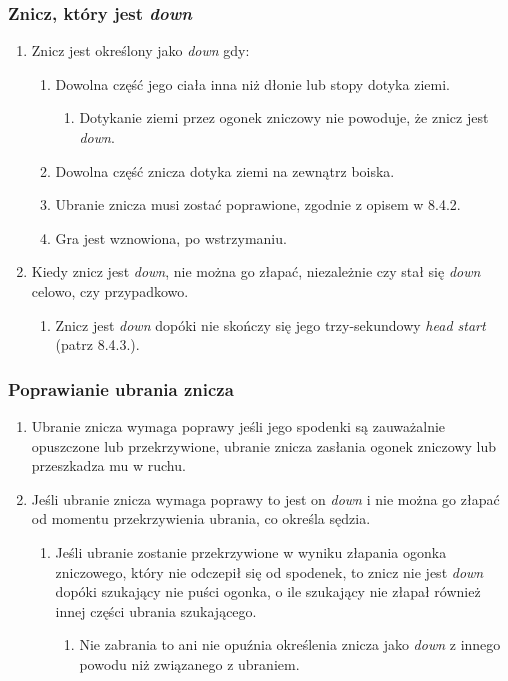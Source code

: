 \documentclass[11pt,a4paper]{article}
\begin{document}
\subsubsection{Znicz, który jest \emph{down}}
\begin{enumerate}
  \item Znicz jest określony jako \emph{down} gdy:
  \begin{enumerate}
    \item Dowolna część jego ciała inna niż dłonie lub stopy dotyka ziemi.
    \begin{enumerate}
      \item Dotykanie ziemi przez ogonek zniczowy nie powoduje, że znicz jest \emph{down}.
    \end{enumerate}
    \item Dowolna część znicza dotyka ziemi na zewnątrz boiska.
    \item Ubranie znicza musi zostać poprawione, zgodnie z opisem w 8.4.2. %
    \item Gra jest wznowiona, po wstrzymaniu.
  \end{enumerate}
  \item Kiedy znicz jest \emph{down}, nie można go złapać, niezależnie czy stał się \emph{down} celowo, czy przypadkowo.
  \begin{enumerate}
    \item Znicz jest \emph{down} dopóki nie skończy się jego trzy-sekundowy \emph{head start} (patrz 8.4.3.). %
  \end{enumerate}
\end{enumerate}

\subsubsection{Poprawianie ubrania znicza}
\begin{enumerate}
  \item Ubranie znicza wymaga poprawy jeśli jego spodenki są zauważalnie opuszczone lub przekrzywione, ubranie znicza zasłania ogonek zniczowy lub przeszkadza mu w ruchu.
  \item Jeśli ubranie znicza wymaga poprawy to jest on \emph{down} i nie można go złapać od momentu przekrzywienia ubrania, co określa sędzia.
  \begin{enumerate}
    \item Jeśli ubranie zostanie przekrzywione w wyniku złapania ogonka zniczowego, który nie odczepił się od spodenek, to znicz nie jest \emph{down} dopóki szukający nie puści ogonka, o ile szukający nie złapał również innej części ubrania szukającego.
    \begin{enumerate}
      \item Nie zabrania to ani nie opuźnia określenia znicza jako \emph{down} z innego powodu niż związanego z ubraniem.
    \end{enumerate}
  \end{enumerate}
\end{enumerate}
\end{document}
